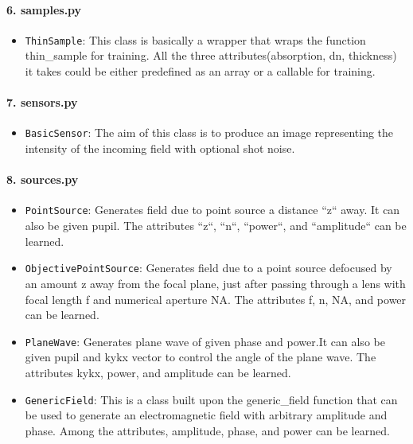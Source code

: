 \documentclass[a4paper,12pt]{report}
\begin{document}
\paragraph*{6. \textbf{samples.py}}
\begin{itemize}
  \item \texttt{ThinSample}: This class is basically a wrapper that wraps the function thin\_sample for training. All the three attributes(absorption, dn, thickness) it takes could be either predefined as an array or a callable for training.
\end{itemize}

\paragraph*{7. \textbf{sensors.py}}
\begin{itemize}
  \item \texttt{BasicSensor}: The aim of this class is to produce an image representing the intensity of the incoming field with optional shot noise.
\end{itemize}

\paragraph*{8. \textbf{sources.py}}
\begin{itemize}
  \item \texttt{PointSource}: Generates field due to point source a distance ``z`` away. It can also be given pupil. The attributes ``z``, ``n``, ``power``, and ``amplitude`` can be learned.
  \item \texttt{ObjectivePointSource}: Generates field due to a point source defocused by an amount z away from the focal plane, just after passing through a lens with focal length f and numerical aperture NA. The attributes f, n, NA, and power can be learned.
  \item \texttt{PlaneWave}: Generates plane wave of given phase and power.It can also be given pupil and kykx vector to control the angle of the
  plane wave. The attributes kykx, power, and amplitude can be learned. 
  \item \texttt{GenericField}: This is a class built upon the generic\_field function that can be used to generate an electromagnetic field with arbitrary amplitude and phase. Among the attributes, amplitude, phase, and power can be learned.   
\end{itemize}
\end{document}
